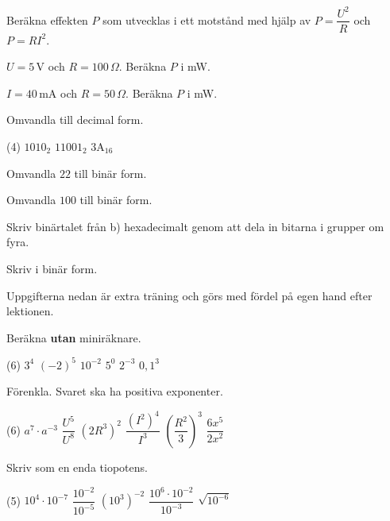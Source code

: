 Beräkna effekten $P$ som utvecklas i ett motstånd med hjälp av $P = \dfrac{U^2}{R}$ och
$P = RI^2$.
\begin{parts}
  \item $U = 5\,\text{V}$ och $R = 100\,\Omega$. Beräkna $P$ i mW.
  \item $I = 40\,\text{mA}$ och $R = 50\,\Omega$. Beräkna $P$ i mW.
\end{parts}

Omvandla till decimal form.
\begin{delar}(4)
  \task $1010_2$
  \task $11001_2$
  \task $\mathrm{3A}_{16}$
  \task {}
\end{delar}

\begin{parts}
  \item Omvandla $22$ till binär form.
  \item Omvandla $100$ till binär form.
  \item Skriv binärtalet från b) hexadecimalt genom att dela in bitarna i grupper om fyra.
  \item Skriv  i binär form.
\end{parts}

Uppgifterna nedan är extra träning och görs med fördel på egen hand efter lektionen.

Beräkna \textbf{utan} miniräknare.
\begin{delar}(6)
  \task $3^4$
  \task $(-2)^5$
  \task $10^{-2}$
  \task $5^0$
  \task $2^{-3}$
  \task $0{,}1^3$
\end{delar}

Förenkla. Svaret ska ha positiva exponenter.
\begin{delar}(6)
  \task $a^7 \cdot a^{-3}$
  \task $\dfrac{U^5}{U^8}$
  \task $(2R^3)^2$
  \task $\dfrac{(I^2)^4}{I^3}$
  \task $\left(\dfrac{R^2}{3}\right)^3$
  \task $\dfrac{6x^5}{2x^2}$
\end{delar}

Skriv som en enda tiopotens.
\begin{delar}(5)
  \task $10^4 \cdot 10^{-7}$
  \task $\dfrac{10^{-2}}{10^{-5}}$
  \task $\left(10^3\right)^{-2}$
  \task $\dfrac{10^6 \cdot 10^{-2}}{10^{-3}}$
  \task $\sqrt{10^{-6}}$
\end{delar}

